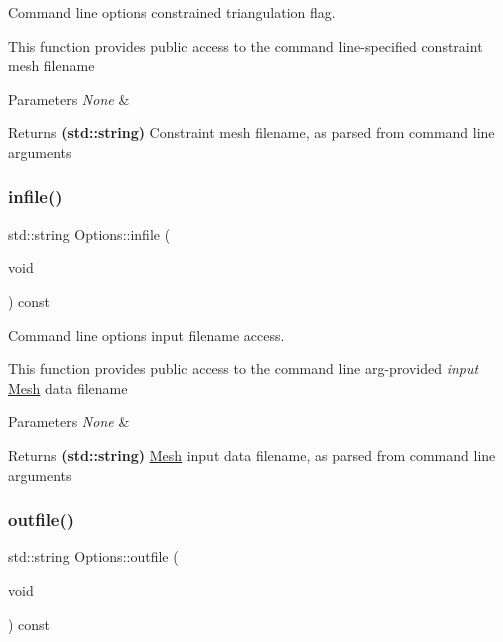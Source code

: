 Command line options constrained triangulation flag. 

This function provides public access to the command line-\/specified constraint mesh filename 
\begin{DoxyParams}{Parameters}
{\em None} & \\
\hline
\end{DoxyParams}
\begin{DoxyReturn}{Returns}
{\bfseries (std\+::string)} Constraint mesh filename, as parsed from command line arguments 
\end{DoxyReturn}
\mbox{\label{class_options_af5fc0ecb4b117c5438f07762fa7f565a}} 
\subsubsection{\texorpdfstring{infile()}{infile()}}
{\footnotesize\ttfamily std\+::string Options\+::infile (\begin{DoxyParamCaption}\item[{void}]{ }\end{DoxyParamCaption}) const\hspace{0.3cm}{\ttfamily [inline]}}



Command line options input filename access. 

This function provides public access to the command line arg-\/provided {\itshape input} \mbox{\hyperlink{class_mesh}{Mesh}} data filename 
\begin{DoxyParams}{Parameters}
{\em None} & \\
\hline
\end{DoxyParams}
\begin{DoxyReturn}{Returns}
{\bfseries (std\+::string)} \mbox{\hyperlink{class_mesh}{Mesh}} input data filename, as parsed from command line arguments 
\end{DoxyReturn}
\mbox{\label{class_options_a35e8029289fef81902b98422e5b9aff8}} 
\subsubsection{\texorpdfstring{outfile()}{outfile()}}
{\footnotesize\ttfamily std\+::string Options\+::outfile (\begin{DoxyParamCaption}\item[{void}]{ }\end{DoxyParamCaption}) const\hspace{0.3cm}{\ttfamily [inline]}}



